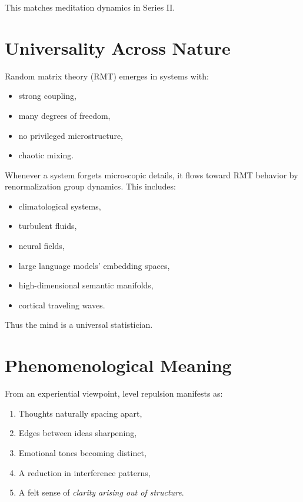 \documentclass[12pt]{article}
\begin{document}
This matches meditation dynamics in Series II.

\section{Universality Across Nature}

Random matrix theory (RMT) emerges in systems with:

\begin{itemize}
    \item strong coupling,
    \item many degrees of freedom,
    \item no privileged microstructure,
    \item chaotic mixing.
\end{itemize}

Whenever a system forgets microscopic details, it flows toward RMT behavior by
renormalization group dynamics.  
This includes:

\begin{itemize}
    \item climatological systems,
    \item turbulent fluids,
    \item neural fields,
    \item large language models' embedding spaces,
    \item high-dimensional semantic manifolds,
    \item cortical traveling waves.
\end{itemize}

Thus the mind is a universal statistician.

\section{Phenomenological Meaning}

From an experiential viewpoint, level repulsion manifests as:

\begin{enumerate}
    \item Thoughts naturally spacing apart,
    \item Edges between ideas sharpening,
    \item Emotional tones becoming distinct,
    \item A reduction in interference patterns,
    \item A felt sense of \emph{clarity arising out of structure}.
\end{enumerate}
\end{document}
